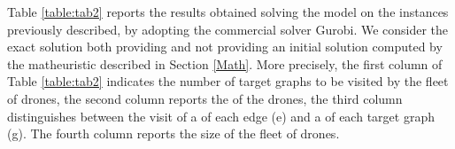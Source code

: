 \noindent
Table \ref{table:tab2} reports the results obtained solving the \AMMDRPG model on the instances previously described, by adopting the commercial solver Gurobi. We consider the exact solution both providing and not providing an initial solution computed by the matheuristic described in Section \ref{Math}. More precisely, the first column of Table \ref{table:tab2} indicates the number of target graphs to be visited by the fleet of drones, the second column reports the  of the drones, the third column distinguishes between the visit of a  of each edge (e) and a  of each target graph (g). The fourth column reports the size of the fleet of drones. \\

